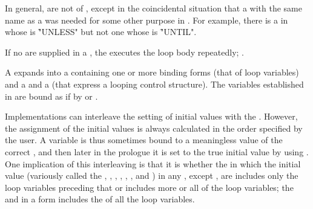 In general,  are not  of ,
except in the coincidental situation that a  with the same name as a
 was needed for some other purpose in \clisp.  For example,
there is a  in  whose  is \f{"UNLESS"} but
not one whose  is \f{"UNTIL"}.

If no  are supplied in a  ,
the {\LoopFacility} executes the loop body repeatedly; \seesection\SimpleLoop.

\endsubsubsection%



A   expands into a  containing
one or more binding forms (that   of loop variables)
and a  and a  (that express a looping control 
structure). The variables established in  are bound as
if by  or .  

Implementations can interleave the setting of initial values with the .  
However, the assignment of the initial values is always calculated in the order
specified by the user.  A variable is thus sometimes bound to a meaningless value 
of the correct , and then later in the prologue it is set to the true
initial value by using .
One implication of this interleaving is that it is 
whether the  in which the initial value 
(variously called the , , , ,
 , , and ) in any ,
except ,
are  includes only the loop variables preceding that 
or includes more or all of the loop variables;
the  and  in a  form
includes the  of all the loop variables.
 
